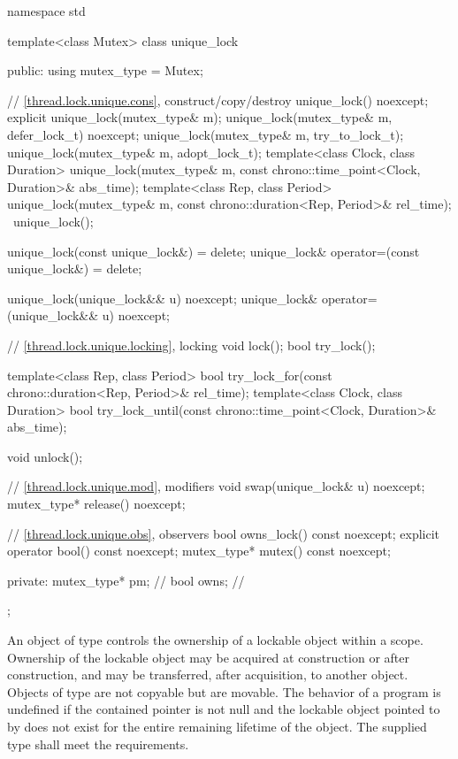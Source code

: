 %
\begin{codeblock}
namespace std {
  template<class Mutex>
  class unique_lock {
  public:
    using mutex_type = Mutex;

    // \ref{thread.lock.unique.cons}, construct/copy/destroy
    unique_lock() noexcept;
    explicit unique_lock(mutex_type& m);
    unique_lock(mutex_type& m, defer_lock_t) noexcept;
    unique_lock(mutex_type& m, try_to_lock_t);
    unique_lock(mutex_type& m, adopt_lock_t);
    template<class Clock, class Duration>
      unique_lock(mutex_type& m, const chrono::time_point<Clock, Duration>& abs_time);
    template<class Rep, class Period>
      unique_lock(mutex_type& m, const chrono::duration<Rep, Period>& rel_time);
    ~unique_lock();

    unique_lock(const unique_lock&) = delete;
    unique_lock& operator=(const unique_lock&) = delete;

    unique_lock(unique_lock&& u) noexcept;
    unique_lock& operator=(unique_lock&& u) noexcept;

    // \ref{thread.lock.unique.locking}, locking
    void lock();
    bool try_lock();

    template<class Rep, class Period>
      bool try_lock_for(const chrono::duration<Rep, Period>& rel_time);
    template<class Clock, class Duration>
      bool try_lock_until(const chrono::time_point<Clock, Duration>& abs_time);

    void unlock();

    // \ref{thread.lock.unique.mod}, modifiers
    void swap(unique_lock& u) noexcept;
    mutex_type* release() noexcept;

    // \ref{thread.lock.unique.obs}, observers
    bool owns_lock() const noexcept;
    explicit operator bool() const noexcept;
    mutex_type* mutex() const noexcept;

  private:
    mutex_type* pm;             // \expos
    bool owns;                  // \expos
  };
}
\end{codeblock}

\pnum
An object of type  controls the ownership of a lockable
object within a scope. Ownership of the lockable object may be acquired at
construction or after construction, and may be transferred, after
acquisition, to another  object. Objects of type  are not
copyable but are movable. The behavior of a program is undefined if the contained pointer
 is not null and the lockable object pointed
to by  does not exist for the entire remaining
lifetime of the  object. The supplied
 type shall meet the 
requirements.

